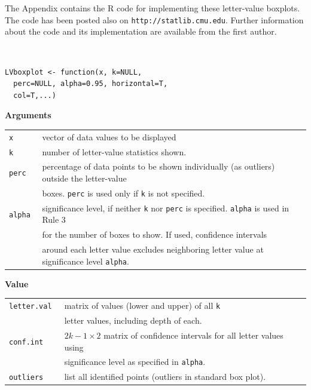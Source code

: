 \documentclass[oneside]{article}
\begin{document}
The Appendix contains the R code for implementing these
letter-value boxplots.  The code has been posted also on
\texttt{http://statlib.cmu.edu}.
Further information about the code and its implementation
are available from the first author.

{\tt
\begin{verbatim}
LVboxplot <- function(x, k=NULL, 
  perc=NULL, alpha=0.95, horizontal=T, 
  col=T,...) 
\end{verbatim}}

\noindent
\textbf{Arguments}

\medskip \noindent
\begin{tabular}{l l }
\tt x & vector of data values to be displayed \\
\tt k & number of letter-value statistics shown. \\
\tt perc & percentage of data points to be shown individually 
            (as outliers) outside the letter-value \\
         & boxes.  {\tt perc} is used only if {\tt k} is not specified.\\
\tt alpha & significance level, if neither {\tt k} 
            nor {\tt perc} is specified.  {\tt alpha} is used in Rule 3 \\
          & for the number of boxes to show.  If used, confidence intervals \\
          & around each letter value  excludes neighboring letter value 
          at significance level {\tt alpha}. 
\end{tabular}

\bigskip \noindent
\textbf{Value}

\medskip \noindent
\begin{tabular}{l l}
\tt letter.val & matrix of values (lower and upper) of all {\tt k}  \\
               & letter values, including depth of each.\\
\tt conf.int & $2k-1 \times 2$ matrix of confidence intervals for 
                         all letter values using \\
             & significance level as specified in {\tt alpha}.\\ 
\tt outliers & list all identified points (outliers 
in standard box plot).\\
\end{tabular}



\end{document}
